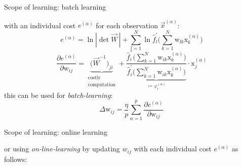 \begin{frame}{Scope of learning: batch learning}

with an individual cost $e^{(\alpha)}$ for each observation $\vec{x}^{(\alpha)}$:
\begin{equation}
	e^{(\alpha)} = \ln |\det \vec{W}\,| + \sum\limits_{l = 1}^N \ln
		\widehat{f}_l^{'} \Bigg( \sum\limits_{k = 1}^N 
		\mathrm{w}_{lk} \mathrm{x}_k^{(\alpha)} \Bigg)
\end{equation}
\begin{equation}
	\frac{\partial e^{(\alpha)}}{\partial \mathrm{w}_{ij}}
	= \underbrace{ \big( \vec{W}^{-1} \big)_{ji} }_{
		\substack{ \text{costly} \\ \text{computation}} }
		+ \underbrace{  
			\frac{ \widehat{f}_i^{''} \bigg( \sum\limits_{k = 1}^N 
				\mathrm{w}_{ik} \mathrm{x}_k^{(\alpha)} \bigg)
			}{\widehat{f}_i^{'} \bigg( \sum\limits_{k = 1}^N 
			\mathrm{w}_{ik} \mathrm{x}_k^{(\alpha)} \bigg)}
			 }_{ \coloneqq \varphi_i^{(\alpha)} }
		\cdot \mathrm{x}_j^{(\alpha)}
\end{equation}
this can be used for \emph{batch-learning}:
\begin{equation}
	\Delta \mathrm{w}_{ij}
	= \frac{\eta}{p} \sum\limits_{\alpha = 1}^p 
	\frac{\partial e^{(\alpha)}}{\partial \mathrm{w}_{ij}}
\end{equation}

\end{frame}

\begin{frame}{Scope of learning: online learning}

or using \emph{on-line-learning} by updating $w_{ij}$ with each individual cost $e^{(\alpha)}$ as follows:


\end{frame}

